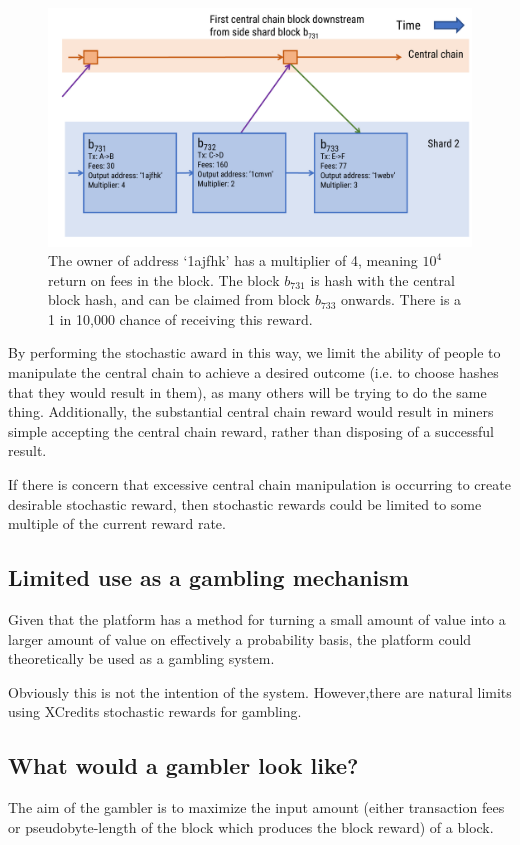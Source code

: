\documentclass[a4paper,12pt]{article}
\begin{document}
\begin{figure}[!htb]
  \centering
  \includegraphics[page=1,width=.95\textwidth]{stochastic-reward} 
  \caption{The owner of address `1ajfhk' has a multiplier of 4, meaning $10^4$ return on fees in the block. The block $b_731$ is hash with the central block hash, and can be claimed from block $b_733$ onwards. There is a 1 in 10,000 chance of receiving this reward.}
  \label{fig:stochastic-reward}
\end{figure}
\FloatBarrier

By performing the stochastic award in this way, we limit the ability of people to manipulate the central chain to achieve a desired outcome (i.e. to choose hashes that they would result in them), as many others will be trying to do the same thing. Additionally, the substantial central chain reward would result in miners simple accepting the central chain reward, rather than disposing of a successful result. 

If there is concern that excessive central chain manipulation is occurring to create desirable stochastic reward, then stochastic rewards could be limited to some multiple of the current reward rate. 

\subsection{Limited use as a gambling mechanism}
Given that the platform has a method for turning a small amount of value into a larger amount of value on effectively a probability basis, the platform could theoretically be used as a gambling system.

Obviously this is not the intention of the system. However,there are natural limits using XCredits stochastic rewards for gambling.  

\subsection{What would a gambler look like?}
The aim of the gambler is to maximize the input amount (either transaction fees or pseudobyte-length of the block which produces the block reward) of a block.  
\end{document}
